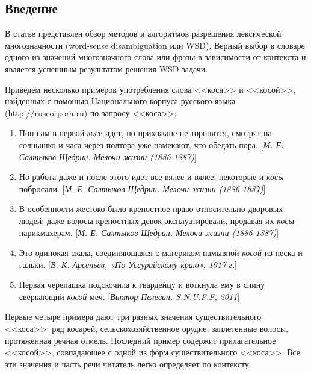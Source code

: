 \documentclass{article}
\begin{document}
\maketitle

\begin{articletext}

\section{Введение}
В статье представлен обзор методов и алгоритмов разрешения лексической многозначности (word-sense disambiguation или WSD). Верный выбор в словаре одного из значений многозначного слова или фразы в зависимости от контекста и является успешным результатом решения WSD-задачи.

Приведем несколько примеров употребления слова <<коса>> и <<косой>>, найденных с помощью Национального корпуса русского языка (http://ruscorpora.ru) по запросу <<коса>>:

\begin{enumerate}
\item Поп сам в первой \textit{\underline{косе}} идет, но прихожане не торопятся, смотрят на солнышко и часа через полтора уже намекают, что обедать пора. {\footnotesize[\textit{М. Е. Салтыков-Щедрин. Мелочи жизни (1886-1887)}]}
\item Но работа даже и после этого идет все вялее и вялее; некоторые и \textit{\underline{косы}} побросали. {\footnotesize[\textit{М. Е. Салтыков-Щедрин. Мелочи жизни (1886-1887)}]}
\item В особенности жестоко было крепостное право относительно дворовых людей: даже волосы крепостных девок эксплуатировали, продавая их \textit{\underline{косы}} парикмахерам. {\footnotesize[\textit{М. Е. Салтыков-Щедрин. Мелочи жизни (1886-1887)}]}
\item Это одинокая скала, соединяющаяся с материком намывной \textit{\underline{косой}} из песка и гальки. {\footnotesize[\textit{В. К. Арсеньев, «По Уссурийскому краю», 1917 г.}]}
\item Первая черепашка подскочила к гвардейцу и воткнула ему в спину сверкающий \textit{\underline{косой}} меч. {\footnotesize[\textit{Виктор Пелевин. S.N.U.F.F, 2011}]}
\end{enumerate}

Первые четыре примера дают три разных значения существительного <<коса>>: ряд косарей, сельскохозяйственное орудие, заплетенные волосы, протяженная речная отмель. Последний пример содержит прилагательное <<косой>>, совпадающее с одной из форм существительного <<коса>>. Все эти значения и часть речи читатель легко определяет по контексту. 


\end{articletext}
\end{document}
